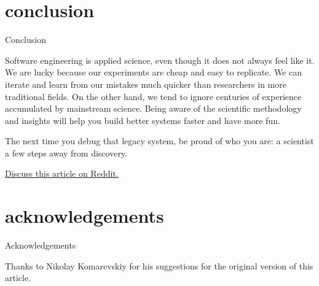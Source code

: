 \documentclass{article}
\begin{document}
\section{conclusion}{Conclusion}

Software engineering is applied science, even though it does not always feel like it.
We are lucky because our experiments are cheap and easy to replicate.
We can iterate and learn from our mistakes much quicker than researchers in more traditional fields.
On the other hand, we tend to ignore centuries of experience accumulated by mainstream science.
Being aware of the scientific methodology and insights will help you build better systems faster and have more fun.

The next time you debug that legacy system, be proud of who you are: a scientist a few steps away from discovery.

\href{https://www.reddit.com/r/programming/comments/ttld4n/1st_april_blog_post_debug_like_feynman_test_like/}{Discuss this article on Reddit.}

\section{acknowledgements}{Acknowledgements}

Thanks to Nikolay Komarevskiy for his suggestions for the original version of this article.
\end{document}
